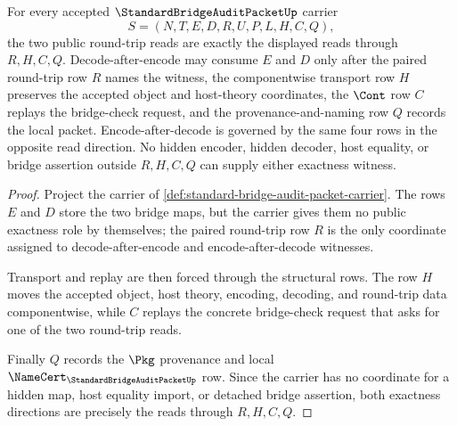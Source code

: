 \begin{theorem}
\label{thm:standard-bridge-audit-packet-round-trip-exactness}
For every accepted $\StandardBridgeAuditPacketUp$ carrier
$$
S=(N,T,E,D,R,U,P,L,H,C,Q),
$$
the two public round-trip reads are exactly the displayed reads through $R,H,C,Q$. Decode-after-encode may consume $E$ and $D$ only after the paired round-trip row $R$ names the witness, the componentwise transport row $H$ preserves the accepted object and host-theory coordinates, the $\Cont$ row $C$ replays the bridge-check request, and the provenance-and-naming row $Q$ records the local packet. Encode-after-decode is governed by the same four rows in the opposite read direction. No hidden encoder, hidden decoder, host equality, or bridge assertion outside $R,H,C,Q$ can supply either exactness witness.
\end{theorem}
\begin{proof}
Project the carrier of \autoref{def:standard-bridge-audit-packet-carrier}. The rows $E$ and $D$ store the two bridge maps, but the carrier gives them no public exactness role by themselves; the paired round-trip row $R$ is the only coordinate assigned to decode-after-encode and encode-after-decode witnesses.

Transport and replay are then forced through the structural rows. The row $H$ moves the accepted object, host theory, encoding, decoding, and round-trip data componentwise, while $C$ replays the concrete bridge-check request that asks for one of the two round-trip reads.

Finally $Q$ records the $\Pkg$ provenance and local $\NameCert_{\StandardBridgeAuditPacketUp}$ row. Since the carrier has no coordinate for a hidden map, host equality import, or detached bridge assertion, both exactness directions are precisely the reads through $R,H,C,Q$.
\end{proof}

